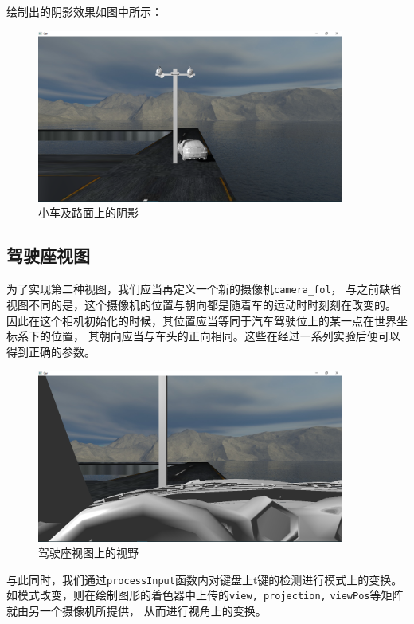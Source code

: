 \documentclass[UTF8]{ctexart}
\begin{document}
\par 
绘制出的阴影效果如图中所示：
\begin{figure}[h]
	\centering
	\includegraphics*[width=0.9\textwidth]{7.png}
	\caption{小车及路面上的阴影}
	\label{fig:7}
\end{figure}


\subsection{驾驶座视图}
\par
为了实现第二种视图，我们应当再定义一个新的摄像机\verb|camera_fol|，
与之前缺省视图不同的是，这个摄像机的位置与朝向都是随着车的运动时时刻刻在改变的。
因此在这个相机初始化的时候，其位置应当等同于汽车驾驶位上的某一点在世界坐标系下的位置，
其朝向应当与车头的正向相同。这些在经过一系列实验后便可以得到正确的参数。

\begin{figure}[h]
	\centering
	\includegraphics*[width=0.9\textwidth]{8.png}
	\caption{驾驶座视图上的视野}
	\label{fig:8}
\end{figure}

\par
与此同时，我们通过\verb|processInput|函数内对键盘上t键的检测进行模式上的变换。
如模式改变，则在绘制图形的着色器中上传的\verb|view, projection,| \verb|viewPos|等矩阵就由另一个摄像机所提供，
从而进行视角上的变换。
\end{document}
